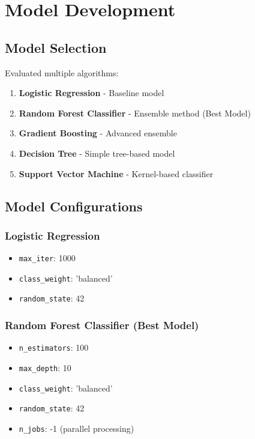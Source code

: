 \documentclass[12pt,a4paper]{article}
\begin{document}
\section{Model Development}

\subsection{Model Selection}
Evaluated multiple algorithms:

\begin{enumerate}
    \item \textbf{Logistic Regression} - Baseline model
    \item \textbf{Random Forest Classifier} - Ensemble method (Best Model)
    \item \textbf{Gradient Boosting} - Advanced ensemble
    \item \textbf{Decision Tree} - Simple tree-based model
    \item \textbf{Support Vector Machine} - Kernel-based classifier
\end{enumerate}

\subsection{Model Configurations}

\subsubsection{Logistic Regression}
\begin{itemize}
    \item \texttt{max\_iter}: 1000
    \item \texttt{class\_weight}: 'balanced'
    \item \texttt{random\_state}: 42
\end{itemize}

\subsubsection{Random Forest Classifier (Best Model)}
\begin{itemize}
    \item \texttt{n\_estimators}: 100
    \item \texttt{max\_depth}: 10
    \item \texttt{class\_weight}: 'balanced'
    \item \texttt{random\_state}: 42
    \item \texttt{n\_jobs}: -1 (parallel processing)
\end{itemize}
\end{document}
